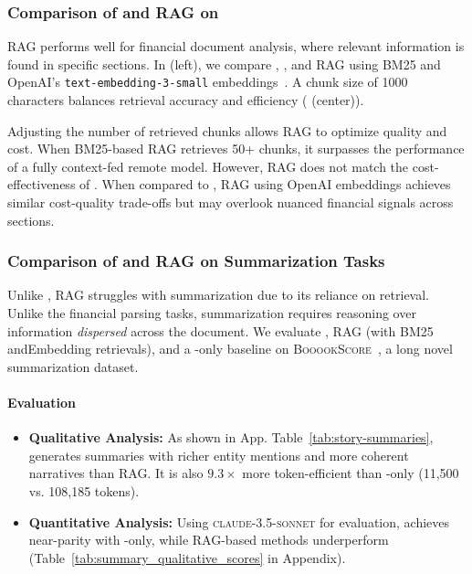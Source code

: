 \subsubsection{Comparison of \system and RAG on \finance}

RAG performs well for financial document analysis, where relevant information is found in specific sections. In  (left), we compare \system, \naive, and RAG using BM25 and OpenAI's \texttt{text-embedding-3-small} embeddings~\citep{article,neelakantan2022text}. A chunk size of 1000 characters balances retrieval accuracy and efficiency ( (center)).

Adjusting the number of retrieved chunks allows RAG to optimize quality and cost. When BM25-based RAG retrieves 50+ chunks, it surpasses the performance of a fully context-fed remote model. However, RAG does not match the cost-effectiveness of \naive. When compared to \system, RAG using OpenAI embeddings achieves similar cost-quality trade-offs but may overlook nuanced financial signals across sections.

\subsubsection{Comparison of \system and RAG on Summarization Tasks}

Unlike \finance, RAG struggles with summarization due to its reliance on retrieval. Unlike the financial parsing tasks, summarization requires reasoning over information \textit{dispersed} across the document.  We evaluate \system, RAG (with BM25 andEmbedding retrievals), and a \gpt-only baseline on \textsc{BooookScore}~\citep{chang2023booookscore}, a long novel summarization dataset.

\paragraph{Evaluation}
\begin{itemize}
\item \textbf{Qualitative Analysis:} As shown in App. Table~\ref{tab:story-summaries}, \system generates summaries with richer entity mentions and more coherent narratives than RAG. It is also $9.3\times$ more token-efficient than \gpt-only (11,500 vs. 108,185 tokens).
\item \textbf{Quantitative Analysis:} Using \textsc{claude-3.5-sonnet} for evaluation, \system achieves near-parity with \gpt-only, while RAG-based methods underperform (Table~\ref{tab:summary_qualitative_scores} in Appendix).
\end{itemize}

